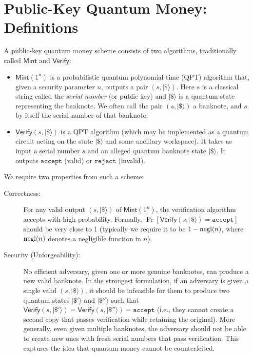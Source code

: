 \documentclass[11pt]{article}
\theoremstyle{definition}
\begin{document}
\section{Public-Key Quantum Money: Definitions}
A public-key quantum money scheme consists of two algorithms, traditionally called $\mathsf{Mint}$ and $\mathsf{Verify}$:
\begin{itemize}
    \item $\mathsf{Mint}(1^n)$ is a probabilistic quantum polynomial-time (QPT) algorithm that, given a security parameter $n$, outputs a pair $(s, |\$\rangle)$. Here $s$ is a classical string called the \emph{serial number} (or public key) and $|\$\rangle$ is a quantum state representing the banknote. We often call the pair $(s, |\$\rangle)$ a banknote, and $s$ by itself the serial number of that banknote.
    \item $\mathsf{Verify}(s, |\$\rangle)$ is a QPT algorithm (which may be implemented as a quantum circuit acting on the state $|\$\rangle$ and some ancillary workspace). It takes as input a serial number $s$ and an alleged quantum banknote state $|\$\rangle$. It outputs $\mathtt{accept}$ (valid) or $\mathtt{reject}$ (invalid).
\end{itemize}

We require two properties from such a scheme:
\begin{description}
    \item[Correctness:] For any valid output $(s, |\$\rangle)$ of $\mathsf{Mint}(1^n)$, the verification algorithm accepts with high probability. Formally, $\Pr[\mathsf{Verify}(s, |\$\rangle) = \mathtt{accept}]$ should be very close to 1 (typically we require it to be $1 - \operatorname{negl}(n)$, where $\operatorname{negl}(n)$ denotes a negligible function in $n$).
    \item[Security (Unforgeability):] No efficient adversary, given one or more genuine banknotes, can produce a new valid banknote. In the strongest formulation, if an adversary is given a single valid $(s, |\$\rangle)$, it should be infeasible for them to produce two quantum states $|\$'\rangle$ and $|\$''\rangle$ such that $\mathsf{Verify}(s, |\$'\rangle) = \mathsf{Verify}(s, |\$''\rangle) = \mathtt{accept}$ (i.e., they cannot create a second copy that passes verification while retaining the original). More generally, even given multiple banknotes, the adversary should not be able to create new ones with fresh serial numbers that pass verification. This captures the idea that quantum money cannot be counterfeited.
\end{description}
\end{document}
